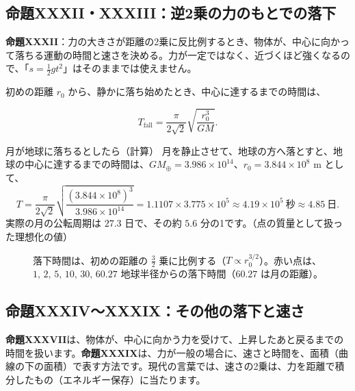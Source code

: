 \documentclass[a4paper,11pt,openany]{ltjsbook}
\begin{document}
\subsection{命題XXXII・XXXIII：逆2乗の力のもとでの落下}

\textbf{命題XXXII}：力の大きさが距離の2乗に反比例するとき、物体が、中心に向かって落ちる運動の時間と速さを決める。力が一定ではなく、近づくほど強くなるので、「$s=\frac12gt^2$」はそのままでは使えません。

初めの距離 $r_0$ から、静かに落ち始めたとき、中心に達するまでの時間は、

\[
T_\text{fall}=\frac{\pi}{2\sqrt2}\sqrt{\frac{r_0^3}{GM}}.
\]

\begin{examplebox}{月が地球に落ちるとしたら（計算）}
月を静止させて、地球の方へ落とすと、地球の中心に達するまでの時間は、$GM_\oplus=3.986\times10^{14}$、$r_0=3.844\times10^8$ m として、
\[
T=\frac{\pi}{2\sqrt2}\sqrt{\frac{(3.844\times10^8)^3}{3.986\times10^{14}}}=1.1107\times3.775\times10^5\approx4.19\times10^5\ \text{秒}\approx4.85\ \text{日}.
\]
実際の月の公転周期は $27.3$ 日で、その約 $5.6$ 分の1です。（点の質量として扱った理想化の値）
\end{examplebox}

\begin{figure}[htbp]
\centering
{}
\caption{落下時間は、初めの距離の $\frac32$ 乗に比例する（$T\propto r_0^{3/2}$）。赤い点は、$1,\,2,\,5,\,10,\,30,\,60.27$ 地球半径からの落下時間（$60.27$ は月の距離）。}
\end{figure}

\subsection{命題XXXIV〜XXXIX：その他の落下と速さ}

\textbf{命題XXXVII}は、物体が、中心に向かう力を受けて、上昇したあと戻るまでの時間を扱います。\textbf{命題XXXIX}は、力が一般の場合に、速さと時間を、面積（曲線の下の面積）で表す方法です。現代の言葉では、速さの2乗は、力を距離で積分したもの（エネルギー保存）に当たります。
\end{document}
